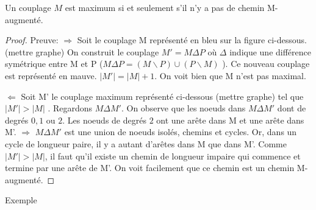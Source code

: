 \begin{mytheo} [Berge]
  Un couplage $M$ est maximum si et seulement s’il n’y a pas de chemin M-augmenté.
  \begin{proof}
     Preuve: 
     $ \Longrightarrow $ Soit le couplage M représenté en bleu sur la figure ci-dessous. \addTODO{} (mettre graphe)
     On construit le couplage $ M' = M \Delta P$ où $\Delta$ indique une différence symétrique entre M et P ($ M \Delta P = ( M \backslash P) \cup ( P \backslash M)$ ). Ce nouveau couplage est représenté en mauve. 
     $ |M'| = |M| + 1 $. On voit bien que M n'est pas maximal. 
     
     
     $\Longleftarrow$ Soit M' le couplage maximum représenté ci-dessous \addTODO{} (mettre graphe)
      tel que $ |M'| > |M| $ . Regardons $ M \Delta M'$. On observe que les noeuds dans $ M \Delta M'$ dont de degrés $0,1$ ou $2$. Les noeuds de degrés $2$ ont une arête dans M et une arête dans M'. $\Rightarrow$ $ M \Delta M'$ est une union de noeuds isolés, chemins et cycles. Or, dans un cycle de longueur paire, il y a autant d'arêtes dans M que dans M'. Comme  $ |M'| > |M| $, il faut qu'il existe un chemin de longueur impaire qui commence et termine par une arête de M'. On voit facilement que ce chemin est un chemin M-augmenté.
     
  \end{proof}
\end{mytheo}
\begin{myexem}
  Exemple \addTODO
\end{myexem}

